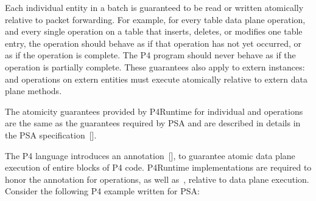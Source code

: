 \documentclass[11pt]{article}
\begin{document}
{%
\noindent{}Each individual entity in a batch is guaranteed to be read or written atomically
relative to packet forwarding. For example, for every table data plane 
operation, and every single  operation on a table that inserts, deletes,
or modifies one table entry, the  operation should behave as if that
 operation has not yet occurred, or as if the  operation is
complete. The P4 program should never behave as if the  operation is
partially complete. These guarantees also apply to extern instances:  and
 operations on extern entities must execute atomically relative to extern
data plane methods.%

The atomicity guarantees provided by P4Runtime for individual  and 
operations are the same as the guarantees required by PSA and are described in
details in the PSA specification~[].%

The P4 language introduces an  annotation~[], to
guarantee atomic data plane execution of entire blocks of P4 code. P4Runtime
implementations are required to honor the  annotation for 
operations, as well as~,
relative to data plane execution. Consider the following P4 example written for
PSA:%

}
\end{document}
